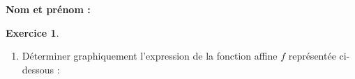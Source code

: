 \documentclass{article}
\theoremstyle{definition}
\newtheorem{exercice}{Exercice}
\begin{document}
\pagestyle{fancy}

\fancyhf{} %
\fancyhead[L]{\large \textbf{\Niveau}}
\fancyhead[C]{\large \textbf{\ChapitreCourt}}

\large

\textbf{Nom et prénom :}\enspace\dotfill

\begin{exercice}
  \begin{enumerate}

    \item Déterminer graphiquement l'expression de la fonction affine $f$ représentée ci-dessous :
    \begin{minipage}{0.7\linewidth}
      \begin{tikzpicture}[baseline,scale = 0.6]


\end{tikzpicture}
\end{minipage}
\end{enumerate}
\end{exercice}
\end{document}
